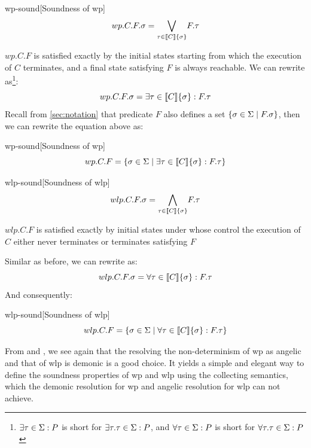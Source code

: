 \begin{theorem}{wp-sound}[Soundness of wp]~{\normalfont\cite{zhang22}} 
\ \vspace{-1.5mm}  
\[
wp.C.F.\sigma = \underset{\tau\in\sem{C}\{\sigma\}}{\bigvee} F.\tau
\]
\end{theorem}

$wp.C.F$ is satisfied exactly by the initial states starting from which the execution of $C$ terminates, and a final state satisfying $F$ is always reachable.
We can rewrite  as\footnote{$\exists\tau\in\S:P$ is short for $\exists\tau.\tau\in\S:P$, and $\forall\tau\in\S:P$ is short for $\forall\tau.\tau\in\S:P$}: 
\[wp.C.F.\sigma = \exists \tau\in\sem{C}\{\sigma\}: F.\tau \]
Recall from \autoref{sec:notation} that predicate $F$ also defines a set $\{\sigma\in\S\mid F.\sigma\}$, then we can rewrite the equation above as: 
\begin{corollary}{wp-sound}[Soundness of wp]
  \[wp.C.F = \{\sigma\in\S\mid\exists\tau\in\sem{C}\{\sigma\}:F.\tau\}\]
\end{corollary}

\begin{theorem}{wlp-sound}[Soundness of wlp]~{\normalfont\cite{zhang22, dijkstra90}}
\ \vspace{-1.5mm} 
\[
wlp.C.F.\sigma = \underset{\tau\in\sem{C}\{\sigma\}}{\bigwedge} F.\tau
\]
\end{theorem}
$wlp.C.F$ is satisfied exactly by initial states under whose control the execution of $C$ either never terminates or terminates satisfying $F$

Similar as before, we can rewrite  as: 
\[
  wlp.C.F.\sigma = \forall \tau\in\sem{C}\{\sigma\}: F.\tau
\]
And consequently: 
\begin{corollary}{wlp-sound}[Soundness of wlp]
\[
  wlp.C.F = \{ \sigma\in\S\mid \forall \tau\in\sem{C}\{\sigma\}: F.\tau\}
\]  
\end{corollary}

From  and , we see again that the resolving the non-determinism of wp as angelic and that of wlp is demonic is a good choice. 
It yields a simple and elegant way to define the soundness properties of wp and wlp using the collecting semantics, which the demonic resolution for wp and angelic resolution for wlp can not achieve. 

